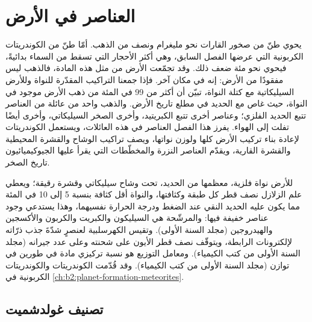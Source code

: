 \chapter{العناصر في الأرض}\label{ch:b2:elements-in-the-earth}

يحوي طنّ من صخور القارات نحو مليغرام ونصف من
الذهب. أمّا طنّ من الكوندريتات الكربونية التي عرضها الفصل السابق، وهي أكثر الأحجار
التي تسقط من السماء بدائيةً، فيحوي نحو مئة ضعف ذلك. وقد تجمّعت
الأرض من مثل هذه المادة، فالذهب ليس مفقودًا من
الأرض: إنه في مكان آخر. فإذا جمعنا التراكيب المقدّرة للنواة وللأرض
السيليكاتية مع كتلة النواة، تبيّن أن أكثر من 99 في المئة من
ذهب الأرض موجود في النواة، حيث غاص مع الحديد في مطلع
تاريخ الأرض. والذهب واحد من عائلة من العناصر تتبع الحديد
الفلزي؛ وعناصر أخرى تتبع الكبريتيد، وأخرى الصخر السيليكاتي، وأخرى أيضًا تفلت
إلى الهواء. يفرز هذا الفصل العناصر في هذه العائلات، ويستعمل
الكوندريتات لإعادة بناء تركيب الأرض كلها ولوزن
نواتها، ويصف تراكيب الوشاح والقشرة المحيطية والقشرة
القارية، ويقدّم العناصر النزرة والمخطّطات التي يقرأ عليها
الجيوكيميائيون تاريخ الصخر.

\begin{recall}
للأرض نواة فلزية، معظمها من الحديد، تحت وشاح سيليكاتي وقشرة
رقيقة؛ ويعطي علم الزلازل نصف قطر كل طبقة وكثافتها، والنواة
أقل كثافة بنسبة 5 إلى 10 في المئة مما يكون عليه الحديد النقي عند الضغط ودرجة الحرارة
نفسيهما، وهذا يستدعي وجود عناصر خفيفة فيها: والمرشّحة هي السيليكون والكبريت والكربون
والأكسجين والهيدروجين (مجلد السنة الأولى).
وتقيس الكهرسلبية لعنصرٍ شدّةَ جذب ذرّاته
لإلكترونات الرابطة، ويتوقّف نصف قطر الأيون على شحنته وعلى
عدد جيرانه (مجلد السنة الأولى من كتب الكيمياء). ومعامل
التوزيع هو نسبة تركيزي مادة في طورين في
توازن (مجلد السنة الأولى من كتب الكيمياء). وقد قُدّمت الكوندريتات والكوندريتات
الكربونية  في
\cref{ch:b2:planet-formation-meteorites}.
\end{recall}

\section{تصنيف غولدشميت}

